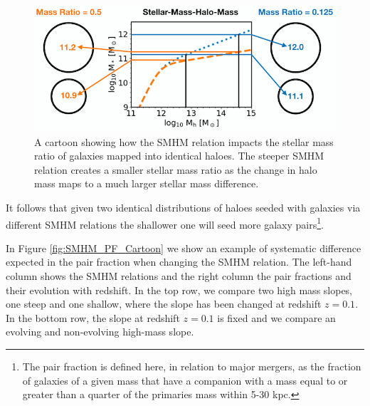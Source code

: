 \begin{figure}[h]
    \centering
    \includegraphics[width = \linewidth]{Figures/Chapter5/MassRatioCartoon.png}
    \caption{A cartoon showing how the SMHM relation impacts the stellar mass ratio of galaxies mapped into identical haloes. The steeper SMHM relation creates a smaller stellar mass ratio as the change in halo mass maps to a much larger stellar mass difference.}
    \label{fig:MassRatioCartoon}
\end{figure}

It follows that given two identical distributions of haloes seeded with galaxies via different SMHM relations the shallower one will seed more galaxy pairs\footnote{The pair fraction is defined here, in relation to major mergers, as the fraction of galaxies of a given mass that have a companion with a mass equal to or greater than a quarter of the primaries mass within 5-30 kpc.}.

In Figure \ref{fig:SMHM_PF_Cartoon} we show an example of systematic difference expected in the pair fraction when changing the SMHM relation.
The left-hand column shows the SMHM relations and the right column the pair fractions and their evolution with redshift. 
In the top row, we compare two high mass slopes, one steep and one shallow, where the slope has been changed at redshift $z = 0.1$.
In the bottom row, the slope at redshift $z = 0.1$ is fixed and we compare an evolving and non-evolving high-mass slope.

